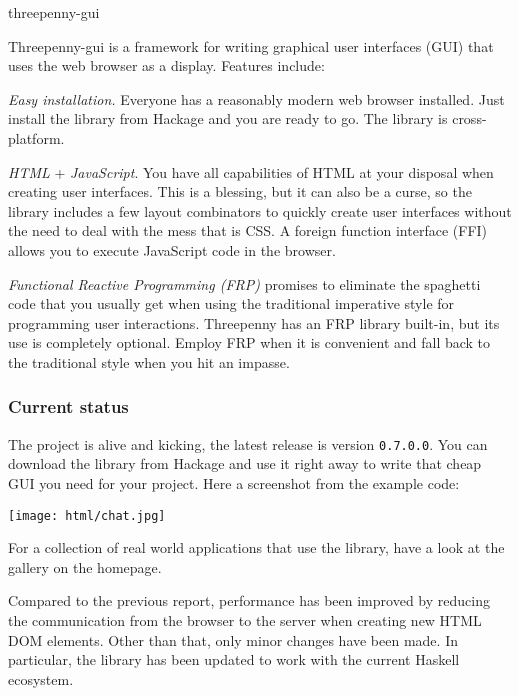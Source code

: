\begin{hcarentry}{threepenny-gui}
\label{threepenny-gui}
\makeheader

Threepenny-gui is a framework for writing graphical user interfaces (GUI)
that uses the web browser as a display. Features include:

\begin{compactitem}
\item \emph{Easy installation.} Everyone has a reasonably modern web browser
  installed. Just install the library from Hackage and you are ready to go.
  The library is cross-platform.
\item \emph{HTML} + \emph{JavaScript}. You have all capabilities of HTML at
  your disposal when creating user interfaces. This is a blessing, but it can
  also be a curse, so the library includes a few layout combinators to quickly
  create user interfaces without the need to deal with the mess that is CSS. A
  foreign function interface (FFI) allows you to execute JavaScript code in
  the browser.
\item \emph{Functional Reactive Programming (FRP)} promises to eliminate the
  spaghetti code that you usually get when using the traditional imperative
  style for programming user interactions. Threepenny has an FRP library
  built-in, but its use is completely optional. Employ FRP when it is
  convenient and fall back to the traditional style when you hit an impasse.
\end{compactitem}

\subsubsection*{Current status}

The project is alive and kicking, the latest release is version
\verb`0.7.0.0`. You can download the library from Hackage and use it right
away to write that cheap GUI you need for your project. Here a screenshot from
the example code:

\begin{center}
\texttt{[image: html/chat.jpg]}
\end{center}

For a collection of real world applications that use the library, have a look
at the gallery on the homepage.

Compared to the previous report, performance has been improved by reducing the communication from the browser to the server when creating new HTML DOM elements. Other than that, only minor changes have been made.
In particular, the library has been updated to work with the current Haskell ecosystem.


\end{hcarentry}
